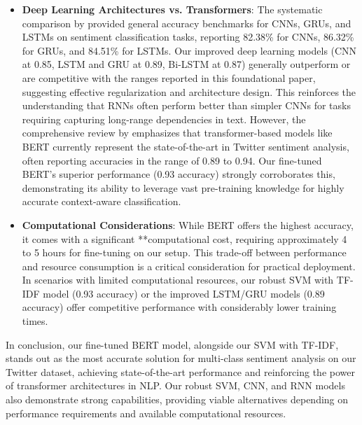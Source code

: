 \begin{itemize}
\item \textbf{Deep Learning Architectures vs. Transformers}: The systematic comparison by \cite{zhou2017systematic} provided general accuracy benchmarks for CNNs, GRUs, and LSTMs on sentiment classification tasks, reporting 82.38\% for CNNs, 86.32\% for GRUs, and 84.51\% for LSTMs. Our improved deep learning models (CNN at 0.85, LSTM and GRU at 0.89, Bi-LSTM at 0.87) generally outperform or are competitive with the ranges reported in this foundational paper, suggesting effective regularization and architecture design. This reinforces the understanding that RNNs often perform better than simpler CNNs for tasks requiring capturing long-range dependencies in text. However, the comprehensive review by \cite{prabhakar2024sentiment} emphasizes that transformer-based models like BERT currently represent the state-of-the-art in Twitter sentiment analysis, often reporting accuracies in the range of 0.89 to 0.94. Our fine-tuned BERT's superior performance (0.93 accuracy) strongly corroborates this, demonstrating its ability to leverage vast pre-training knowledge for highly accurate context-aware classification.

\item \textbf{Computational Considerations}: While BERT offers the highest accuracy, it comes with a significant **computational cost, requiring approximately 4 to 5 hours for fine-tuning on our setup. This trade-off between performance and resource consumption is a critical consideration for practical deployment. In scenarios with limited computational resources, our robust SVM with TF-IDF model (0.93 accuracy) or the improved LSTM/GRU models (0.89 accuracy) offer competitive performance with considerably lower training times.
\end{itemize}

In conclusion, our fine-tuned BERT model, alongside our SVM with TF-IDF, stands out as the most accurate solution for multi-class sentiment analysis on our Twitter dataset, achieving state-of-the-art performance and reinforcing the power of transformer architectures in NLP. Our robust SVM, CNN, and RNN models also demonstrate strong capabilities, providing viable alternatives depending on performance requirements and available computational resources.